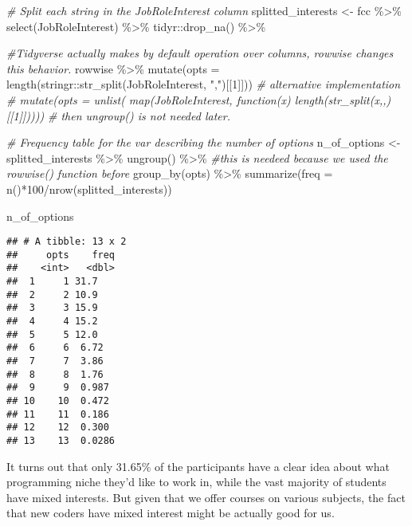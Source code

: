 \documentclass[
]{article}
\newenvironment{Shaded}{\begin{snugshade}}{\end{snugshade}}
\newcommand{\AttributeTok}[1]{\textcolor[rgb]{0.77,0.63,0.00}{#1}}
\newcommand{\CommentTok}[1]{\textcolor[rgb]{0.56,0.35,0.01}{\textit{#1}}}
\newcommand{\DecValTok}[1]{\textcolor[rgb]{0.00,0.00,0.81}{#1}}
\newcommand{\FunctionTok}[1]{\textcolor[rgb]{0.00,0.00,0.00}{#1}}
\newcommand{\NormalTok}[1]{#1}
\newcommand{\OtherTok}[1]{\textcolor[rgb]{0.56,0.35,0.01}{#1}}
\newcommand{\SpecialCharTok}[1]{\textcolor[rgb]{0.00,0.00,0.00}{#1}}
\newcommand{\StringTok}[1]{\textcolor[rgb]{0.31,0.60,0.02}{#1}}
\begin{document}
\begin{Shaded}
\begin{Highlighting}[]
\CommentTok{\# Split each string in the \textquotesingle{}JobRoleInterest\textquotesingle{} column}
\NormalTok{splitted\_interests }\OtherTok{\textless{}{-}}\NormalTok{ fcc }\SpecialCharTok{\%\textgreater{}\%}
  \FunctionTok{select}\NormalTok{(JobRoleInterest) }\SpecialCharTok{\%\textgreater{}\%}
\NormalTok{  tidyr}\SpecialCharTok{::}\FunctionTok{drop\_na}\NormalTok{() }\SpecialCharTok{\%\textgreater{}\%}
  
\CommentTok{\#Tidyverse actually makes by default operation over columns, rowwise changes this behavior.}
\NormalTok{  rowwise }\SpecialCharTok{\%\textgreater{}\%}
  \FunctionTok{mutate}\NormalTok{(}\AttributeTok{opts =} \FunctionTok{length}\NormalTok{(stringr}\SpecialCharTok{::}\FunctionTok{str\_split}\NormalTok{(JobRoleInterest, }\StringTok{","}\NormalTok{)[[}\DecValTok{1}\NormalTok{]]))}
 \CommentTok{\# alternative implementation}
 \CommentTok{\#  mutate(opts = unlist( map(JobRoleInterest, function(x) length(str\_split(x,\textquotesingle{},\textquotesingle{})[[1]]))))}
 \CommentTok{\# then ungroup() is not needed later.}
  
\CommentTok{\# Frequency table for the var describing the number of options}
\NormalTok{n\_of\_options }\OtherTok{\textless{}{-}}\NormalTok{ splitted\_interests }\SpecialCharTok{\%\textgreater{}\%}
  \FunctionTok{ungroup}\NormalTok{() }\SpecialCharTok{\%\textgreater{}\%}  \CommentTok{\#this is needeed because we used the rowwise() function before}
  \FunctionTok{group\_by}\NormalTok{(opts) }\SpecialCharTok{\%\textgreater{}\%}
  \FunctionTok{summarize}\NormalTok{(}\AttributeTok{freq =} \FunctionTok{n}\NormalTok{()}\SpecialCharTok{*}\DecValTok{100}\SpecialCharTok{/}\FunctionTok{nrow}\NormalTok{(splitted\_interests))}

\NormalTok{n\_of\_options}
\end{Highlighting}
\end{Shaded}

\begin{verbatim}
## # A tibble: 13 x 2
##     opts    freq
##    <int>   <dbl>
##  1     1 31.7   
##  2     2 10.9   
##  3     3 15.9   
##  4     4 15.2   
##  5     5 12.0   
##  6     6  6.72  
##  7     7  3.86  
##  8     8  1.76  
##  9     9  0.987 
## 10    10  0.472 
## 11    11  0.186 
## 12    12  0.300 
## 13    13  0.0286
\end{verbatim}

It turns out that only 31.65\% of the participants have a clear idea
about what programming niche they'd like to work in, while the vast
majority of students have mixed interests. But given that we offer
courses on various subjects, the fact that new coders have mixed
interest might be actually good for us.
\end{document}
